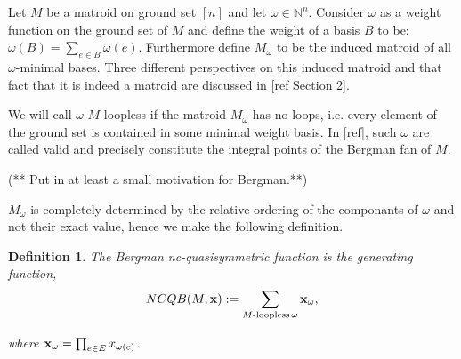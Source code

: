 \documentclass[12pt,reqno]{amsart}
\newtheorem{definition}{Definition}
\numberwithin{definition}{section}
\begin{document}





Let $M$ be a matroid on ground set $[n]$ and let $\omega \in \mathbb{N}^n$.
Consider $\omega$ as a weight function on the ground set of $M$ and define the weight of a basis $B$ to be: $\omega(B) = \sum_{e\in B} \omega(e)$. 
Furthermore define $M_{\omega}$ to be the induced matroid of all
$\omega$-minimal bases.  Three different perspectives on this induced
matroid and that fact that it is indeed a matroid are discussed in [ref Section 2].

  We will call $\omega$ $M$-loopless if the matroid $M_{\omega}$ has
  no loops, i.e.  every element of the ground set is contained in
  some minimal weight basis.  In [ref], such $\omega$ are called 
    valid and precisely constitute the integral points of the Bergman
  fan of $M$.

 (** Put in at least a small motivation for Bergman.**)

$M_{\omega}$ is completely determined by the
relative ordering of the componants of $\omega$ and not their exact
value, hence we make the following definition.


\begin{definition}
The Bergman nc-quasisymmetric function is the generating function,
$$NCQB(M,{\bf x}) := \sum_{M\textrm{-loopless} \, \omega} {\bf x}_{\omega},$$

where ${\bf x}_{\omega} = \prod_{e \in E} x_{\omega(e)}$.
\end{definition}
\end{document}

